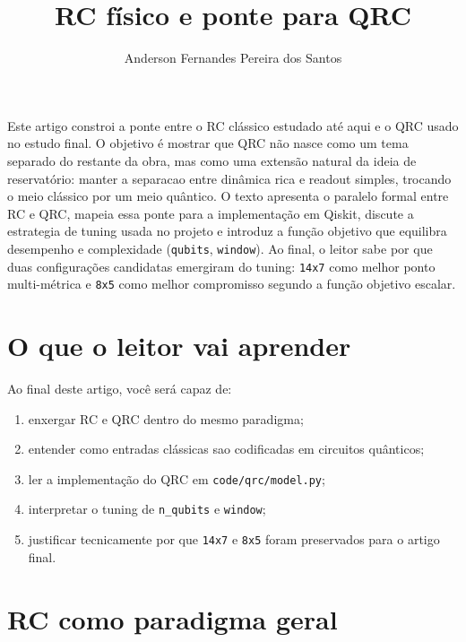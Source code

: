 \documentclass[12pt]{article}
\title{RC físico e ponte para QRC}
\author{Anderson Fernandes Pereira dos Santos}
\providecommand{\tightlist}{%
              \setlength{\itemsep}{0pt}\setlength{\parskip}{0pt}}
\begin{document}
            \maketitle

            \begin{resumo}
            Este artigo constroi a ponte entre o RC clássico estudado até aqui e o QRC usado no estudo final. O objetivo é mostrar que QRC não nasce como um tema separado do restante da obra, mas como uma extensão natural da ideia de reservatório: manter a separacao entre dinâmica rica e readout simples, trocando o meio clássico por um meio quântico. O texto apresenta o paralelo formal entre RC e QRC, mapeia essa ponte para a implementação em Qiskit, discute a estrategia de tuning usada no projeto e introduz a função objetivo que equilibra desempenho e complexidade (\texttt{qubits}, \texttt{window}). Ao final, o leitor sabe por que duas configurações candidatas emergiram do tuning: \texttt{14x7} como melhor ponto multi-métrica e \texttt{8x5} como melhor compromisso segundo a função objetivo escalar.
            \end{resumo}

            \section{O que o leitor vai aprender}\label{1-o-que-o-leitor-vai-aprender}

Ao final deste artigo, você será capaz de:

\begin{enumerate}
\def\labelenumi{\arabic{enumi}.}
\tightlist
\item
  enxergar RC e QRC dentro do mesmo paradigma;
\item
  entender como entradas clássicas sao codificadas em circuitos quânticos;
\item
  ler a implementação do QRC em \texttt{code/qrc/model.py};
\item
  interpretar o tuning de \texttt{n\_qubits} e \texttt{window};
\item
  justificar tecnicamente por que \texttt{14x7} e \texttt{8x5} foram preservados para o artigo final.
\end{enumerate}

\section{RC como paradigma geral}\label{2-rc-como-paradigma-geral}
\end{document}

